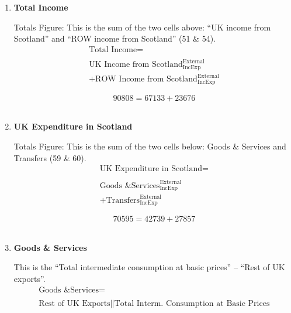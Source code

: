 \begin{enumerate}
\item \textbf {Total Income}

Totals Figure: This is the sum of the two cells above: “UK income from Scotland” and “ROW income from Scotland” (51 \& 54).\\

\begin{equation}
\begin{split}
\text{Total Income} =  \\ \\
\text{UK Income from Scotland}^\text{External}_\text{IncExp}\\
+\text{ROW Income from Scotland}^\text{External}_\text{IncExp}
\end{split} \label{eq:2.5.61}
\end{equation}

\begin{equation} \nonumber
90808 = 67133+23676
\end{equation}\\



\pagebreak

\item \textbf {UK Expenditure in Scotland}

Totals Figure: This is the sum of the two cells below: Goods \& Services and Transfers (59 \& 60).\\

\begin{equation}
\begin{split}
\text{UK Expenditure in Scotland} =  \\ \\
\text{Goods \& Services}^\text{External}_\text{IncExp}\\
+\text{Transfers}^\text{External}_\text{IncExp}
\end{split} \label{eq:2.5.62}
\end{equation}

\begin{equation} \nonumber
70595 = 42739+27857
\end{equation}\\


\item \textbf {Goods \& Services}

This is the “Total intermediate consumption at basic prices” – “Rest of UK exports”. \cite{ScotGov2013a}\\

\begin{equation}
\begin{split}
\text{Goods \& Services} =  \\ \\
\text{Rest of UK Exports}\|\text{Total Interm. Consumption at Basic Prices}
\end{split} \label{eq:2.5.63}
\end{equation}


\end{enumerate}
